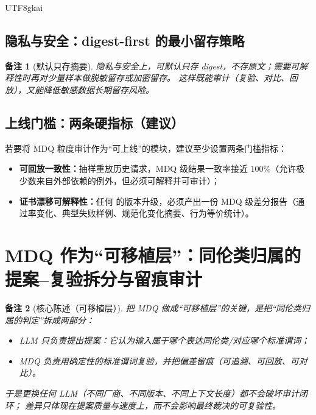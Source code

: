 \documentclass[12pt]{article}
\newtheorem{remark}{备注}[section]
\newcommand{\code}[1]{\path{#1}}
\begin{document}
\begin{CJK*}{UTF8}{gkai}
\subsection{隐私与安全：digest-first 的最小留存策略}
\label{subsec:privacy-min-retention}

\begin{remark}[默认只存摘要]
隐私与安全上，可默认只存 digest，不存原文；需要可解释性时再对少量样本做脱敏留存或加密留存。
这样既能审计（复验、对比、回放），又能降低敏感数据长期留存风险。
\end{remark}

\subsection{上线门槛：两条硬指标（建议）}
\label{subsec:audit-gates}

若要将 MDQ 粒度审计作为“可上线”的模块，建议至少设置两条门槛指标：
\begin{itemize}
  \item \textbf{可回放一致性：}抽样重放历史请求，MDQ 级结果一致率接近 $100\%$（允许极少数来自外部依赖的例外，但必须可解释并可审计）；
  \item \textbf{证书漂移可解释性：}任何 \code{mdq_type} 的版本升级，必须产出一份 MDQ 级差分报告（通过率变化、典型失败样例、规范化变化摘要、行为等价统计）。
\end{itemize}

\clearpage

\section{MDQ 作为“可移植层”：同伦类归属的提案--复验拆分与留痕审计}
\label{sec:mdq-portable-layer-homotopy-membership}

\begin{remark}[核心陈述（可移植层）]
把 MDQ 做成“可移植层”的关键，是把“同伦类归属的判定”拆成两部分：
\begin{itemize}
  \item LLM 只负责提出提案：它认为输入属于哪个表达同伦类/对应哪个标准谓词；
  \item MDQ 负责用确定性的标准谓词复验，并把偏差留痕（可追溯、可回放、可对比）。
\end{itemize}
于是更换任何 LLM（不同厂商、不同版本、不同上下文长度）都不会破坏审计闭环；
差异只体现在提案质量与速度上，而不会影响最终裁决的可复验性。
\end{remark}


\end{CJK*}
\end{document}

